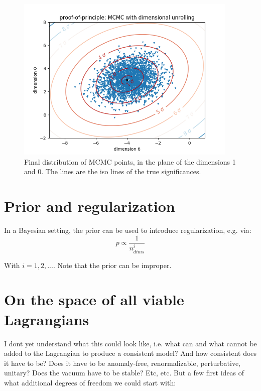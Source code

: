 \documentclass[11pt,singleside,a4paper,makeidx,notitlepage]{article}
\begin{document}
\begin{figure}[h!t]
\begin{center}
\includegraphics[width=300pt]{xz.png}
\caption{Final distribution of MCMC points, in the plane of the dimensions 1
and 0. The lines are the iso lines of the true significances.}
\label{fig_xz}
\end{center}
\end{figure}

\section{Prior and regularization}
In a Bayesian setting, the prior can be used to introduce regularization, e.g.
via:
\begin{equation}
  p \propto \frac{1}{n^{i}_{dims}}
\end{equation}

With $i=1,2,... $. Note that the prior can be improper.
\newpage

\section{On the space of all viable Lagrangians}

I dont yet understand what this could look like, i.e. what can and what cannot
be added to the Lagrangian to produce a consistent model? And how consistent
does it have to be? Does it have to be anomaly-free, renormalizable,
perturbative, unitary? Does the vacuum have to be stable? Etc, etc. 
But a few first ideas of what additional degrees of freedom we could start
with:
\end{document}
